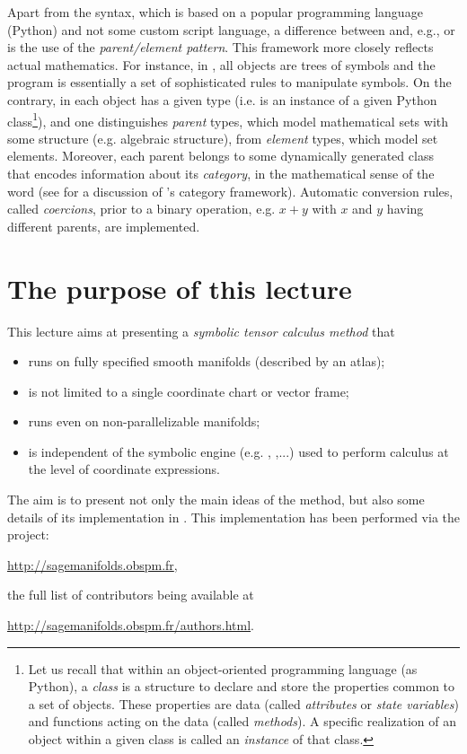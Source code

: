 Apart from the syntax, which is based on a popular programming language
(Python) and not some custom script
language, a difference between \Sage{} and, e.g.,  or 
is the use of the \emph{parent/element pattern}. This framework more closely
reflects actual mathematics.
For instance, in , all objects
are trees of symbols and the program is essentially a set of
sophisticated rules to manipulate symbols. On the contrary, in \Sage{}
each object has a given type (i.e. is an instance of a given
Python class\footnote{Let us
recall that within an object-oriented programming language (as Python),
a \emph{class} is a structure to declare and store the
properties common to a set of objects. These properties
are data (called
\emph{attributes} or \emph{state variables}) and functions acting
on the data (called \emph{methods}). A specific realization of an object
within a given class is called an \emph{instance} of that class.}),
and one distinguishes \emph{parent} types, which model mathematical
sets with some structure (e.g. algebraic structure), from \emph{element} types,
which model set elements. Moreover, each parent belongs to some
dynamically generated class that encodes information
about its \emph{category}, in the mathematical sense of the word
(see \cite{sage_categories} for a discussion of \Sage{}'s category framework).
Automatic conversion rules, called \emph{coercions},
prior to a binary operation, e.g. $x+y$ with $x$ and $y$ having different
parents, are implemented.

\section{The purpose of this lecture}

This lecture aims at presenting
a \emph{symbolic tensor calculus method} that
\begin{itemize}
\item runs on fully specified smooth manifolds (described by an atlas);
\item is not limited to a single coordinate chart or vector frame;
\item runs even on non-parallelizable manifolds;
\item is independent of the symbolic engine (e.g.  ,
,...) used to perform calculus at the level of coordinate expressions.
\end{itemize}
The aim is to present not only the main ideas of the method, but also some details of its implementation in \Sage{}. This implementation has been
performed via the  project:
\begin{center}
\url{http://sagemanifolds.obspm.fr},
\end{center}
the full list of contributors being available at
\begin{center}
\url{http://sagemanifolds.obspm.fr/authors.html}.
\end{center}
